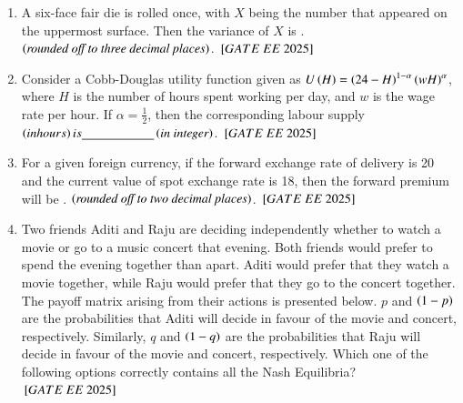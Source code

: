 \documentclass[journal,12pt,onecolumn]{IEEEtran}
\theoremstyle{remark}
\begin{document}
\begin{enumerate}
\item A six-face fair die is rolled once, with $X$ being the number that appeared on the uppermost surface. Then the variance of $X$ is \underline{\hspace{2cm}}.  $\left(\textit{rounded off to three decimal places}\right)$.
 \hfill $\sbrak{GATE\ EE\ 2025}$
\item Consider a Cobb-Douglas utility function given as $U \left(H\right) =  \left(24-H\right)^{1-\alpha} \left(wH\right)^\alpha$, where $H$ is the number of hours spent working per day, and $w$ is the wage rate per hour. If $\alpha = \frac{1}{2}$, then the corresponding labour supply  $\left(in hours\right) is \underline{\hspace{2cm}}  \left(\textit{in integer}\right)$.
 \hfill $\sbrak{GATE\ EE\ 2025}$
\item For a given foreign currency, if the forward exchange rate of delivery is 20 and the current value of spot exchange rate is 18, then the forward premium will be \underline{\hspace{2cm}}.  $\left(\textit{rounded off to two decimal places}\right)$.
 \hfill $\sbrak{GATE\ EE\ 2025}$
\item Two friends Aditi and Raju are deciding independently whether to watch a movie or go to a music concert that evening. Both friends would prefer to spend the evening together than apart. Aditi would prefer that they watch a movie together, while Raju would prefer that they go to the concert together. The payoff matrix arising from their actions is presented below. $p$ and $ \left(1-p\right)$ are the probabilities that Aditi will decide in favour of the movie and concert, respectively. Similarly, $q$ and $ \left(1-q\right)$ are the probabilities that Raju will decide in favour of the movie and concert, respectively. Which one of the following options correctly contains all the Nash Equilibria?\\

\hfill $\sbrak{GATE\ EE\ 2025}$
\begin{enumerate}
\end{enumerate}
 

\end{enumerate}
\end{document}
